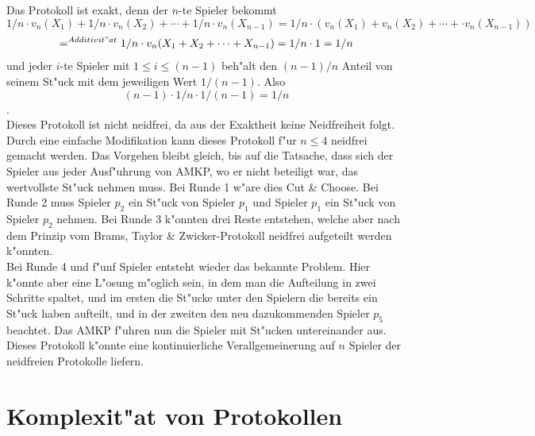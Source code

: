 \documentclass[11pt, a4paper, twoside]{article}
\numberwithin{equation}{section}
\begin{document}
\newline
\newline
\newline
Das Protokoll ist exakt, denn der $n$-te Spieler bekommt $$1/n\cdot v_n(X_1)+1/n\cdot v_n(X_2)+\cdots+1/n\cdot v_n(X_{n-1})=1/n\cdot(v_n(X_1)+v_n(X_2)+\cdots+\cdot v_n(X_{n-1}))$$ $$=^{Additivit"at}1/n\cdot v_n(X_1+X_2+\cdots+X_{n-1})=1/n \cdot 1=1/n$$ und jeder $i$-te Spieler mit $1 \leq i \leq (n-1)$ beh"alt den $(n-1)/n$ Anteil von seinem St"uck mit dem jeweiligen Wert $1/(n-1)$. Also $$(n-1)\cdot 1/{n\cdot 1/(n-1)}=1/n$$.\\
Dieses Protokoll ist nicht neidfrei, da aus der Exaktheit keine Neidfreiheit folgt. Durch eine einfache Modifikation kann dieses Protokoll f"ur $n \leq 4$ neidfrei gemacht werden.
Das Vorgehen bleibt gleich, bis auf die Tatsache, dass sich der Spieler aus jeder Ausf"uhrung von AMKP, wo er nicht beteiligt war, das wertvollste St"uck nehmen muss. Bei Runde 1 w"are dies Cut \& Choose. Bei Runde 2 muss Spieler $p_2$ ein St"uck von Spieler $p_1$ und Spieler $p_1$ ein St"uck  von Spieler $p_2$ nehmen. Bei Runde 3 k"onnten drei Reste entstehen, welche aber nach dem Prinzip vom Brams, Taylor \& Zwicker-Protokoll neidfrei aufgeteilt werden k"onnten.\\Bei Runde 4 und f"unf Spieler entsteht wieder das bekannte Problem. Hier k"onnte aber eine L"osung m"oglich sein, in dem man die Aufteilung in zwei Schritte spaltet, und im ersten die St"ucke unter den Spielern die bereits ein St"uck haben aufteilt, und in der zweiten den neu dazukommenden Spieler $p_5$ beachtet. Das AMKP f"uhren nun die Spieler mit St"ucken untereinander aus. Dieses Protokoll k"onnte eine kontinuierliche Verallgemeinerung auf $n$ Spieler der neidfreien Protokolle liefern.\\ 
\section{Komplexit"at von Protokollen}
\end{document}
